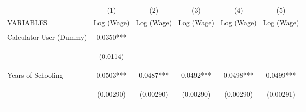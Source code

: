 \begin{center}
\begin{tabular}{lccccc} \hline
 & (1) & (2) & (3) & (4) & (5) \\
VARIABLES & Log (Wage) & Log (Wage) & Log (Wage) & Log (Wage) & Log (Wage) \\ \hline
\vspace{4pt} & \begin{footnotesize}\end{footnotesize} & \begin{footnotesize}\end{footnotesize} & \begin{footnotesize}\end{footnotesize} & \begin{footnotesize}\end{footnotesize} & \begin{footnotesize}\end{footnotesize} \\
Calculator User (Dummy) & 0.0350*** &  &  &  &  \\
\vspace{4pt} & \begin{footnotesize}(0.0114)\end{footnotesize} & \begin{footnotesize}\end{footnotesize} & \begin{footnotesize}\end{footnotesize} & \begin{footnotesize}\end{footnotesize} & \begin{footnotesize}\end{footnotesize} \\
Years of Schooling & 0.0503*** & 0.0487*** & 0.0492*** & 0.0498*** & 0.0499*** \\
\vspace{4pt} & \begin{footnotesize}(0.00290)\end{footnotesize} & \begin{footnotesize}(0.00290)\end{footnotesize} & \begin{footnotesize}(0.00290)\end{footnotesize} & \begin{footnotesize}(0.00290)\end{footnotesize} & \begin{footnotesize}(0.00291)\end{footnotesize} \\

\end{tabular}
\end{center}

